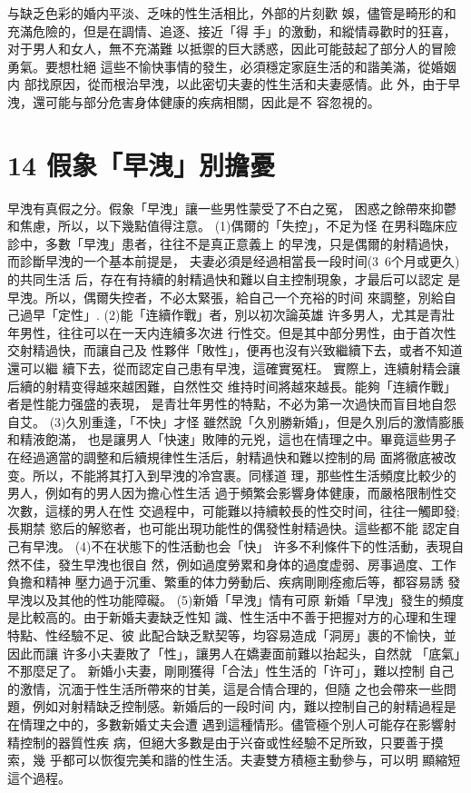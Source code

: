 \documentclass[12pt,UTF8]{ctexbook}
\begin{document}
与缺乏色彩的婚内平淡、乏味的性生活相比，外部的片刻歡
娛，儘管是畸形的和充滿危險的，但是在調情、追逐、接近「得
手」的激動，和縱情尋歡时的狂喜，对于男人和女人，無不充滿難
以抵禦的巨大誘惑，因此可能鼓起了部分人的冒險勇氣。要想杜絕
這些不愉快事情的發生，必須穩定家庭生活的和諧美滿，從婚姻内
部找原因，從而根治早洩，以此密切夫妻的性生活和夫妻感情。此
外，由于早洩，還可能与部分危害身体健康的疾病相關，因此是不
容忽視的。

\section{14 假象「早洩」別擔憂}

早洩有真假之分。假象「早洩」讓一些男性蒙受了不白之冤，
困惑之餘帶來抑鬱和焦慮，所以，以下幾點值得注意。
(1)偶爾的「失控」，不足为怪
在男科臨床应診中，多數「早洩」患者，往往不是真正意義上
的早洩，只是偶爾的射精過快，而診斷早洩的一个基本前提是，
夫妻必須是经過相當長一段时间(3~6个月或更久)的共同生活
后，存在有持續的射精過快和難以自主控制現象，才最后可以認定
是早洩。所以，偶爾失控者，不必太緊張，給自己一个充裕的时间
來調整，別給自己過早「定性」.
(2)能「连續作戰」者，別以初次論英雄
许多男人，尤其是青壯年男性，往往可以在一天内连續多次进
行性交。但是其中部分男性，由于首次性交射精過快，而讓自己及
性夥伴「敗性」，便再也沒有兴致繼續下去，或者不知道還可以繼
續下去，從而認定自己患有早洩，這確實冤枉。
實際上，连續射精会讓后續的射精变得越來越困難，自然性交
维持时间將越來越長。能夠「连續作戰」者是性能力强盛的表現，
是青壮年男性的特點，不必为第一次過快而盲目地自怨自艾。
(3)久別重逢，「不快」才怪
雖然說「久別勝新婚」，但是久別后的激情膨脹和精液飽滿，
也是讓男人「快速」敗陣的元兇，這也在情理之中。畢竟這些男子
在经過適當的調整和后續規律性生活后，射精過快和難以控制的局
面將徹底被改变。所以，不能將其打入到早洩的冷宫裹。同樣道
理，那些性生活頻度比較少的男人，例如有的男人因为擔心性生活
過于頻繁会影響身体健康，而嚴格限制性交次數，這樣的男人在性
交過程中，可能難以持續較長的性交时间，往往一觸即發;長期禁
慾后的解慾者，也可能出現功能性的偶發性射精過快。這些都不能
認定自己有早洩。
(4)不在状態下的性活動也会「快」
许多不利條件下的性活動，表現自然不佳，發生早洩也很自
然，例如過度勞累和身体的過度虚弱、房事過度、工作負擔和精神
壓力過于沉重、繁重的体力勞動后、疾病剛剛痊癒后等，都容易誘
發早洩以及其他的性功能障礙。
(5)新婚「早洩」情有可原
新婚「早洩」發生的頻度是比較高的。由于新婚夫妻缺乏性知
識、性生活中不善于把握对方的心理和生理特點、性经驗不足、彼
此配合缺乏默契等，均容易造成「洞房」裹的不愉快，並因此而讓
许多小夫妻敗了「性」，讓男人在嬌妻面前難以抬起头，自然就
「底氣」不那麼足了。
新婚小夫妻，剛剛獲得「合法」性生活的「许可」，難以控制
自己的激情，沉湎于性生活所帶來的甘美，這是合情合理的，但隨
之也会帶來一些問題，例如对射精缺乏控制感。新婚后的一段时间
内，難以控制自己的射精過程是在情理之中的，多數新婚丈夫会遭
遇到這種情形。儘管極个別人可能存在影響射精控制的器質性疾
病，但絕大多數是由于兴奋或性经驗不足所致，只要善于摸索，幾
乎都可以恢復完美和諧的性生活。夫妻雙方積極主動參与，可以明
顯縮短這个過程。
\end{document}
